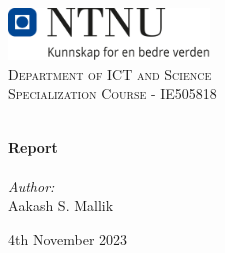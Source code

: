 
\begin{titlepage}
\vbox{ }
\vbox{ }
\begin{center}
\includegraphics[width=0.40\textwidth]{Images/NTNU_logo.png}\\[1cm]
\textsc{\LARGE Department of ICT and Science}\\[1.5cm]
\textsc{\Large Specialization Course - IE505818}\\[0.5cm]
\vbox{ }

\HRule \\[0.6cm]
{ \huge \bfseries Report}\\[0.4cm]
\HRule \\[1.1cm]

\large
\emph{Author:}\\
Aakash S. Mallik
\vfill

{\large 4th November 2023}
\end{center}
\end{titlepage}